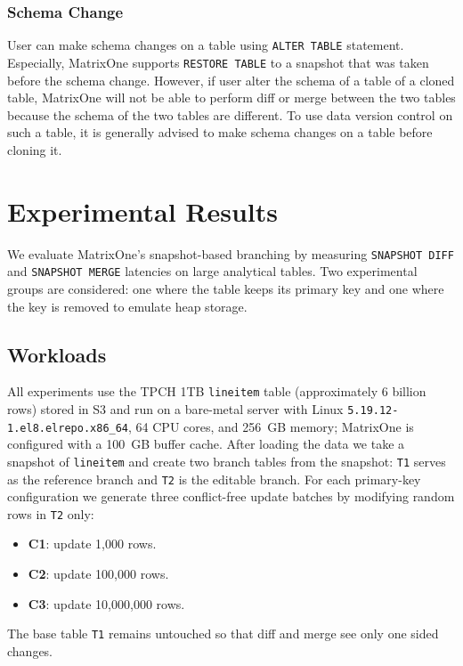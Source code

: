 \documentclass[sigconf,nonacm]{acmart} %
\begin{document}
\subsubsection{Schema Change}
User can make schema changes on a table using \texttt{ALTER TABLE} 
statement.  Especially, MatrixOne supports \texttt{RESTORE TABLE} 
to a snapshot that was taken before the schema change.  However, 
if user alter the schema of a table of a cloned table, MatrixOne
will not be able to perform diff or merge between the two tables
because the schema of the two tables are different.  To use data
version control on such a table, it is generally advised to make 
schema changes on a table before cloning it. 


\section{Experimental Results}
We evaluate MatrixOne's snapshot-based branching by measuring
\texttt{SNAPSHOT DIFF} and \texttt{SNAPSHOT MERGE} latencies on large
analytical tables.  Two experimental groups are considered: one where
the table keeps its primary key and one where the key is removed to
emulate heap storage.

\subsection{Workloads}
All experiments use the TPCH 1TB \texttt{lineitem} table (approximately
6 billion rows) stored in S3 and run on a bare-metal server with
Linux \texttt{5.19.12-1.el8.elrepo.x86\_64}, 64 CPU cores, and 256~GB
memory; MatrixOne is configured with a 100~GB buffer cache.  After
loading the data we take a snapshot of \texttt{lineitem} and create two
branch tables from the snapshot: \texttt{T1} serves as the reference
branch and \texttt{T2} is the editable branch.  For each primary-key
configuration we generate three conflict-free update batches by
modifying random rows in \texttt{T2} only:

\begin{itemize}
\item \textbf{C1}: update 1{,}000 rows.
\item \textbf{C2}: update 100{,}000 rows.
\item \textbf{C3}: update 10{,}000{,}000 rows.
\end{itemize}

The base table \texttt{T1} remains untouched so that diff and merge see
only one sided changes.
\end{document}

